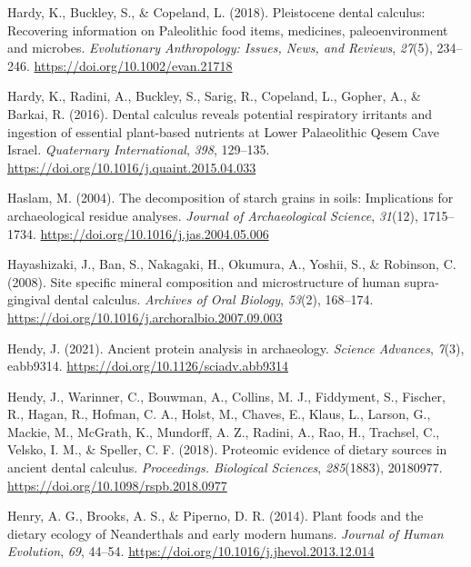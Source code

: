 \documentclass[
  letterpaper,
]{book}
\newlength{\cslhangindent}
\newlength{\cslentryspacingunit} %
\newenvironment{CSLReferences}[2] %
 {%
  \setlength{\parindent}{0pt}
  \ifodd #1
  \let\oldpar\par
  \def\par{\hangindent=\cslhangindent\oldpar}
  \fi
  \setlength{\parskip}{#2\cslentryspacingunit}
 }%
 {}
\begin{document}
\begin{CSLReferences}{1}{0}
\leavevmode{}%
Hardy, K., Buckley, S., \& Copeland, L. (2018). Pleistocene dental
calculus: {Recovering} information on {Paleolithic} food items,
medicines, paleoenvironment and microbes. \emph{Evolutionary
Anthropology: Issues, News, and Reviews}, \emph{27}(5), 234--246.
\url{https://doi.org/10.1002/evan.21718}

\leavevmode{}%
Hardy, K., Radini, A., Buckley, S., Sarig, R., Copeland, L., Gopher, A.,
\& Barkai, R. (2016). Dental calculus reveals potential respiratory
irritants and ingestion of essential plant-based nutrients at {Lower
Palaeolithic Qesem Cave Israel}. \emph{Quaternary International},
\emph{398}, 129--135. \url{https://doi.org/10.1016/j.quaint.2015.04.033}

\leavevmode{}%
Haslam, M. (2004). The decomposition of starch grains in soils:
Implications for archaeological residue analyses. \emph{Journal of
Archaeological Science}, \emph{31}(12), 1715--1734.
\url{https://doi.org/10.1016/j.jas.2004.05.006}

\leavevmode{}%
Hayashizaki, J., Ban, S., Nakagaki, H., Okumura, A., Yoshii, S., \&
Robinson, C. (2008). Site specific mineral composition and
microstructure of human supra-gingival dental calculus. \emph{Archives
of Oral Biology}, \emph{53}(2), 168--174.
\url{https://doi.org/10.1016/j.archoralbio.2007.09.003}

\leavevmode{}%
Hendy, J. (2021). Ancient protein analysis in archaeology. \emph{Science
Advances}, \emph{7}(3), eabb9314.
\url{https://doi.org/10.1126/sciadv.abb9314}

\leavevmode{}%
Hendy, J., Warinner, C., Bouwman, A., Collins, M. J., Fiddyment, S.,
Fischer, R., Hagan, R., Hofman, C. A., Holst, M., Chaves, E., Klaus, L.,
Larson, G., Mackie, M., McGrath, K., Mundorff, A. Z., Radini, A., Rao,
H., Trachsel, C., Velsko, I. M., \& Speller, C. F. (2018). Proteomic
evidence of dietary sources in ancient dental calculus.
\emph{Proceedings. Biological Sciences}, \emph{285}(1883), 20180977.
\url{https://doi.org/10.1098/rspb.2018.0977}

\leavevmode{}%
Henry, A. G., Brooks, A. S., \& Piperno, D. R. (2014). Plant foods and
the dietary ecology of {Neanderthals} and early modern humans.
\emph{Journal of Human Evolution}, \emph{69}, 44--54.
\url{https://doi.org/10.1016/j.jhevol.2013.12.014}


\end{CSLReferences}
\end{document}
